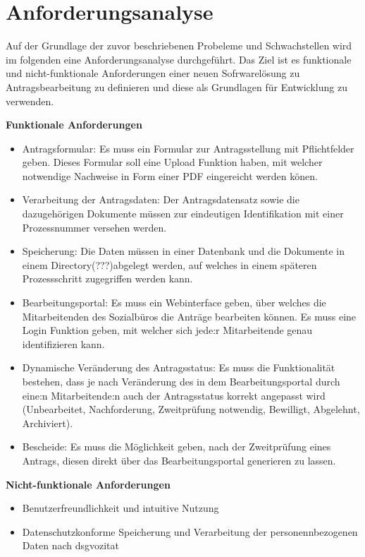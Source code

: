 \section{Anforderungsanalyse}\label{sec:Anforderungsanalyse}
Auf der Grundlage der zuvor beschriebenen Probeleme und Schwachstellen wird im folgenden eine Anforderungsanalyse durchgeführt. Das Ziel ist es funktionale und nicht-funktionale Anforderungen einer neuen Sofrwarelösung zu Antragsbearbeitung zu definieren und diese als Grundlagen für Entwicklung zu verwenden. 

\textbf{Funktionale Anforderungen}
\begin{itemize}
    \item Antragsformular: Es muss ein Formular zur Antragsstellung mit Pflichtfelder geben. Dieses Formular soll eine Upload Funktion haben, mit welcher notwendige Nachweise in Form einer PDF eingereicht werden könen. 
    \item Verarbeitung der Antragsdaten: Der Antragsdatensatz sowie die dazugehörigen Dokumente müssen zur eindeutigen Identifikation mit einer Prozessnummer versehen werden. 
    \item Speicherung: Die Daten müssen in einer Datenbank und die Dokumente in einem Directory(???)abgelegt werden, auf welches in einem späteren Prozessschritt zugegriffen werden kann.
    \item Bearbeitungsportal: Es muss ein Webinterface geben, über welches die Mitarbeitenden des Sozialbüros die Anträge bearbeiten können. Es muss eine Login Funktion geben, mit welcher sich jede:r Mitarbeitende genau identifizieren kann. 
    \item Dynamische Veränderung des Antragsstatus: Es muss die Funktionalität bestehen, dass je nach Veränderung des in dem Bearbeitungsportal durch eine:n Mitarbeitende:n auch der Antragsstatus korrekt angepasst wird (Unbearbeitet, Nachforderung, Zweitprüfung notwendig, Bewilligt, Abgelehnt, Archiviert).
    \item Bescheide: Es muss die Möglichkeit geben, nach der Zweitprüfung eines Antrags, diesen direkt über das Bearbeitungsportal generieren zu lassen. 
\end{itemize}

\textbf{Nicht-funktionale Anforderungen}
\begin{itemize}
    \item Benutzerfreundlichkeit und intuitive Nutzung
    \item Datenschutzkonforme Speicherung und Verarbeitung der personennbezogenen Daten nach \gls{dsgvozitat}
\end{itemize}

